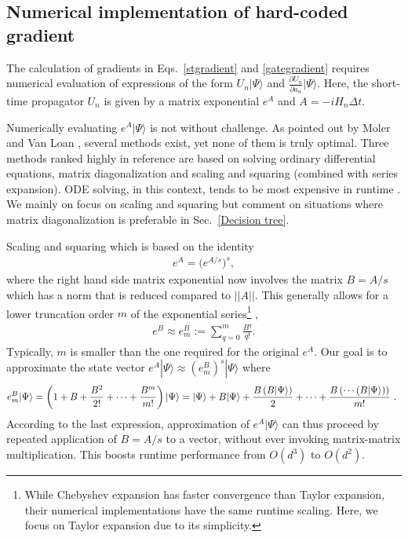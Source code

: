 \documentclass[letterpaper,10pt]{iopart}
\newcommand{\dket}[1]{|#1\rangle}
\newcommand{\norm}[1]{\left|\left|#1\right|\right|}
\newcommand{\parenthesis}[1]{\left(#1\right)}
\begin{document}
\subsection{Numerical implementation of hard-coded gradient}
\label{implementation}

The calculation of gradients in Eqs.\ \eqref{stgradient} and \eqref{gategradient} requires numerical evaluation of expressions of the form $U_n\dket{\Psi}$  and $\frac{\partial U_n}{\partial a_n} \dket{\Psi}$. 
Here, the short-time propagator $U_n$ is given by a matrix exponential $e^A$ and $A=-iH_n\Delta t$. 

Numerically evaluating  $e^A\dket{\Psi}$ is not without challenge. As pointed out by Moler and Van Loan \cite{expmoler2003nineteen}, several methods exist, yet none of them is truly optimal. Three methods ranked highly in reference \cite{expmoler2003nineteen} are based on solving ordinary differential equations, matrix diagonalization and scaling and squaring (combined with series expansion). ODE solving, in this context, tends to be most expensive in runtime \cite{semiadgoerz2022quantum}. We mainly on focus on scaling and squaring but comment on situations where matrix diagonalization is preferable in Sec.\ \ref{Decision tree}. 

Scaling and squaring \cite{codenotti1992error} which is based on the identity
\begin{align}
\label{scaling squaring equation}
   e^A=\big(e^{A/s}\big)^s,
\end{align}
where the right hand side matrix exponential now involves the matrix $B=A/s$ which has a norm that is reduced compared to $\norm{A}$. This generally allows for a lower truncation order $m $ of the exponential series\footnote{While Chebyshev expansion has faster convergence than Taylor expansion, their numerical implementations have the same runtime scaling. Here, we focus on Taylor expansion due to its simplicity.} , 
\begin{align}
\label{eBm equation}
    e^B\approx e^B_m:=\sum_{q=0}^m\frac{ B^q}{q!}.
\end{align}
Typically, $m$ is smaller than the one required for the original $e^A$.
Our goal is to approximate the state vector $e^A \dket{\Psi}\approx (e^B_m)^s\dket{\Psi}$ where 
\begin{equation}
\label{eBmpsi}
   e^B_m\dket{\Psi}= \parenthesis{1+B+\frac{B^2}{2!}+\cdots+\frac{B^m}{m!}}\dket{\Psi}\\\nonumber
   =\dket{\Psi}+B\dket{\Psi}+\frac{B\parenthesis{B\dket{\Psi}}}{2}+\cdots+\frac{B\parenthesis{\cdots \parenthesis{B\dket{\Psi}}}}{m!}\text{   . }
\end{equation}
According to the last expression, approximation of $e^A\dket{\Psi}$ can thus proceed by repeated application of $B=A/s$ to a vector, without ever invoking matrix-matrix multiplication. This boosts runtime performance from $O(d^3)$ to $O(d^2)$.
\end{document}
